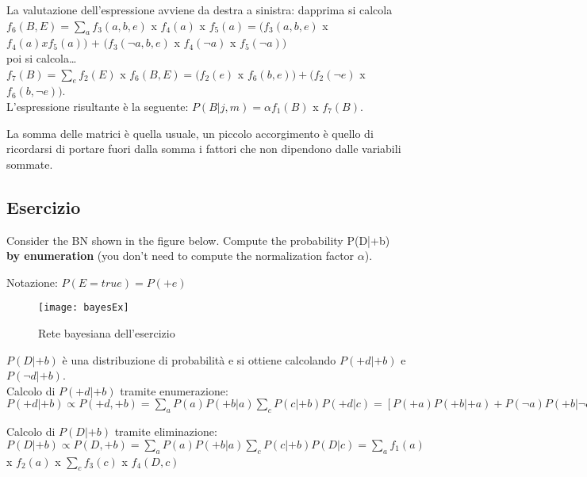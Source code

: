 La valutazione dell'espressione avviene da destra a sinistra: dapprima 
si calcola $f_6(B,E) = \sum_a f_3(a,b,e)$ x $f_4(a)$ x $f_5(a) = (f_3(a,b,e)$ x
$f_4(a) x f_5(a))$ + $(f_3(\neg a,b,e)$ x $f_4(\neg a)$ x $f_5(\neg a))$\\

poi si calcola\dots\\

$f_7(B) = \sum_e f_2(E)$ x $f_6(B,E) = (f_2(e)$ x $f_6(b,e)) + (f_2(\neg e)$ x
$f_6(b, \neg e))$.\\

L'espressione risultante è la seguente: $P(B|j,m) = \alpha f_1(B)$ x $f_7(B)$.

La somma delle matrici è quella usuale, un piccolo accorgimento è quello di
ricordarsi di portare fuori dalla somma i fattori che non dipendono dalle
variabili sommate.

\subsection{Esercizio}

Consider the BN shown in the figure below. Compute the probability
P(D|+b) \textbf{by enumeration} (you don't need to compute the normalization
factor $\alpha$).

Notazione: $P(E = true) = P(+e)$

\begin{figure}[H]
\centering
\texttt{[image: bayesEx]}
\caption{Rete bayesiana dell'esercizio}
\label{fig:bayesEx}
\end{figure}

$P(D|+b)$ è una distribuzione di probabilità e si ottiene calcolando $P(+d|+b)$ e
$P(\neg d|+b)$.\\

Calcolo di $P(+d|+b)$ tramite enumerazione:\\

$P(+d|+b) \propto P(+d, +b) = \sum_a P(a) P(+b|a) \sum_c P(c|+b) P(+d|c) =
[P(+a)P(+b|+a) + P(\neg a) P(+b|\neg a)][P(+c|+b) P(+d|+c) + P(\neg c|+b)
P(+d|\neg c)] = (0.9\cdot 0.7 + 0.1\cdot 0.2)\cdot (0.2\cdot 0.6 + 0.8\cdot 0.9) =
0.546$

Calcolo di $P(D|+b)$ tramite eliminazione:\\

$P(D|+b) \propto P(D, +b) = \sum_a P(a) P(+b|a) \sum_c P(c|+b) P(D|c) =
\sum_a f_1 (a)$ x $f_2 (a)$ x $\sum_c f_3 (c)$ x $f_4 (D, c)$\\

